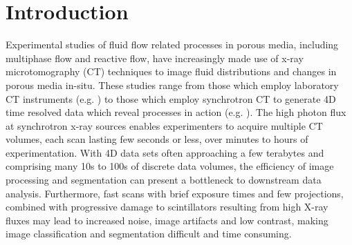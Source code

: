 \documentclass[draft,linenumbers]{agujournal2018}
\begin{document}
%
%
%
%
\section{Introduction}
Experimental studies of fluid flow related processes in porous media, including multiphase flow and reactive flow, have increasingly made use of x-ray microtomography (\textmu CT) techniques to image fluid distributions and changes in porous media in-situ. These studies range from those which employ laboratory \textmu CT instruments (e.g. \citet{pak2015droplet,alratrout2018wettability}) to those which employ synchrotron \textmu CT to generate 4D time resolved data which reveal processes in action (e.g. \citet{berg2014multiphase,reynolds2017dynamic,berg2013real}). The high photon flux at synchrotron x-ray sources enables experimenters to acquire multiple \textmu CT volumes, each scan lasting few seconds or less, over minutes to hours of experimentation. With 4D data sets often approaching a few terabytes and comprising many 10s to 100s of discrete data volumes, the efficiency of image processing and segmentation can present a bottleneck to downstream data analysis. Furthermore, fast scans with brief exposure times and few projections, combined with progressive damage to scintillators resulting from high X-ray fluxes may lead to increased noise, image artifacts and low contrast, making image classification and segmentation difficult and time consuming.
\end{document}
